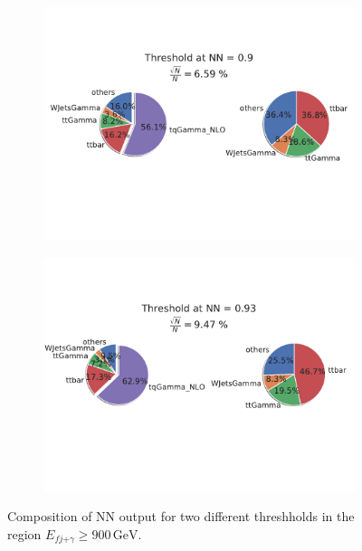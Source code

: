 \begin{figure}
    \centering
    \begin{subfigure}[b]{0.6\textwidth}
       \includegraphics[width=1\linewidth]{Plots/composition9fjA900.pdf}
    \end{subfigure}
    
    \begin{subfigure}[b]{0.6\textwidth}
       \includegraphics[width=1\linewidth]{Plots/compositionTenphA40.pdf}
    \end{subfigure}
    \caption{Composition of NN output for two different threshholds in the region $E_{fj\text{+}\gamma} \geq 900\,\si{\giga\electronvolt}$. }
    \label{fig:fjph_eA900comp}
\end{figure}
